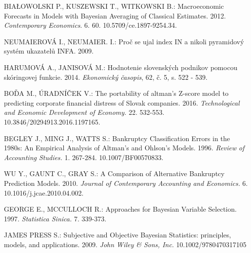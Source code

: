 \begin{thebibliography}{99}
     BIAŁOWOLSKI P., KUSZEWSKI T., WITKOWSKI B.: Macroeconomic Forecasts in Models with Bayesian Averaging of Classical Estimates.
    2012. \emph{Contemporary Economics}. 6. 60. 10.5709/ce.1897-9254.34.

     NEUMAIEROVÁ I., NEUMAIER. I.: Proč se ujal index IN a nikoli pyramidový systém ukazatelů INFA. 2009.

     HARUMOVÁ A., JANISOVÁ M.: Hodnotenie slovenských podnikov pomocou skóringovej funkcie. 2014. \emph{Ekonomický časopis}, 62, č. 5, s. 522 - 539.

     BOĎA M., ÚRADNÍČEK V.: The portability of altman’s Z-score model to predicting corporate financial distress of Slovak companies. 2016.
    \emph{Technological and Economic Development of Economy.} 22. 532-553. 10.3846/20294913.2016.1197165.

     BEGLEY J., MING J., WATTS S.: Bankruptcy Classification Errors in the 1980s: An Empirical Analysis of Altman's and Ohlson's Models.
    1996. \emph{Review of Accounting Studies.} 1. 267-284. 10.1007/BF00570833.

     WU Y., GAUNT C., GRAY S.: A Comparison of Alternative Bankruptcy Prediction Models. 
    2010. \emph{Journal of Contemporary Accounting and Economics.} 6. 10.1016/j.jcae.2010.04.002.

     GEORGE E., MCCULLOCH R.: Approaches for Bayesian Variable Selection. 1997. \emph{Statistica Sinica.} 7. 339-373.

     JAMES PRESS S.: Subjective and Objective Bayesian Statistics: principles, models, and applications. 2009. \emph{John Wiley \& Sons, Inc.} 10.1002/9780470317105

\end{thebibliography}
